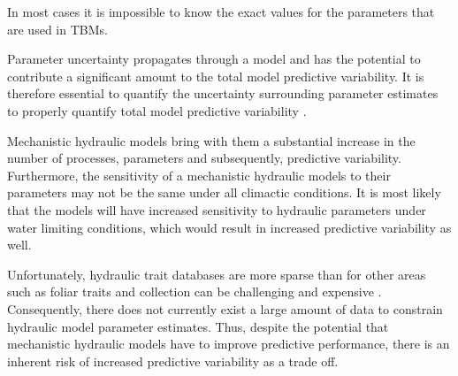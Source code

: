 In most cases it is impossible to know the exact values for the  parameters that are used in TBMs. 



Parameter uncertainty propagates through a model and has the potential to contribute a significant amount to the total model predictive variability. It is therefore essential to quantify the uncertainty surrounding parameter estimates to properly quantify total model predictive variability \citep{dietze_2017, dietze_2017a}. 

Mechanistic hydraulic models bring with them a substantial increase in the number of processes, parameters and subsequently, predictive variability. Furthermore, the sensitivity of a mechanistic hydraulic models to their parameters may not be the same under all climactic conditions. It is most likely that the models will have increased sensitivity to hydraulic parameters under water limiting conditions, which would result in increased predictive variability as well.


Unfortunately, hydraulic trait databases are more sparse than for other areas such as foliar traits and collection can be challenging and expensive \citep{choat_2018}. Consequently, there does not currently exist a large amount of data to constrain hydraulic model parameter estimates.  Thus, despite the potential that mechanistic hydraulic models have to improve predictive performance, there is an inherent risk of increased predictive variability as a trade off.